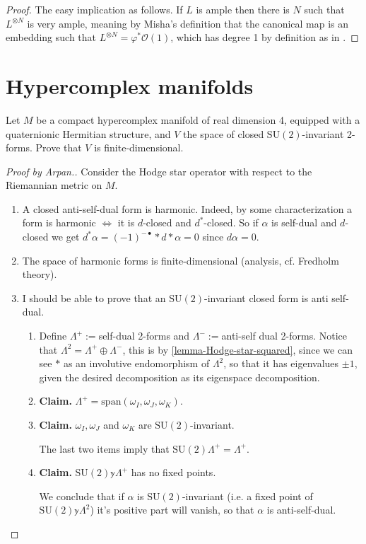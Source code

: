 \begin{proof}
The easy implication as follows. If $L$ is ample then there is $N$ such that
$L^{\otimes N}$ is very ample, meaning by Misha's definition that the canonical
map is an embedding such that $L^{\otimes N}=\varphi^*\mathcal{O}(1)$, which has
degree 1 by definition as in \cite[15.4.14]{sea}.
\end{proof}

\section{Hypercomplex manifolds}
\label{section-hypercomplex-manifolds}

\begin{exercise}
\label{exercise-SU2-invariant-forms}
Let $M$ be a compact hypercomplex manifold of real dimension 4, equipped with a
quaternionic Hermitian structure, and $V$ the space of closed
$\text{SU}(2)$-invariant 2-forms. Prove that $V$ is finite-dimensional.
\end{exercise}

\begin{proof}[Proof by Arpan.]
Consider the Hodge star operator with respect to the Riemannian metric on $M$.
\begin{enumerate}
\item A closed anti-self-dual form is harmonic. Indeed, by some 
characterization a
form is harmonic $\iff$ it is $d$-closed and $d^*$-closed. So if $\alpha$ is
self-dual and $d$-closed we get $d^*\alpha=(-1)^{-\bullet}*d*\alpha=0$ since
$d\alpha=0$.
\item The space of harmonic forms is finite-dimensional (analysis, cf. Fredholm
theory).
\item I should be able to prove that an $\text{SU}(2)$-invariant closed form is
anti self-dual.
\begin{enumerate}
\item Define $\Lambda^+:=$self-dual 2-forms and $\Lambda^-:=$anti-self dual
2-forms. Notice that $\Lambda^2=\Lambda^+ \oplus \Lambda^-$,
this is by \ref{lemma-Hodge-star-squared}, since we can
see $*$ as an involutive endomorphism of $\Lambda^2$,
so that it has eigenvalues $\pm 1$, given the
desired decomposition as its eigenspace decomposition.

\item {\bf Claim.} $\Lambda^+=\text{span}(\omega_I,\omega_J,\omega_K)$.
\item {\bf Claim.} $\omega_I,\omega_J$ and $\omega_K$ are
$\text{SU}(2)$-invariant.

The last two items imply that $\text{SU}(2)\Lambda^+=\Lambda^+$.
\item {\bf Claim.} $\text{SU}(2)\mathbb{y}\Lambda^+$ has no fixed points.

We conclude that if $\alpha$ is $\text{SU}(2)$-invariant (i.e. a fixed point of
$\text{SU}(2)\mathbb{y}\Lambda^2$) it's positive part will vanish, so that
$\alpha$ is anti-self-dual.
\end{enumerate}
\end{enumerate}
\end{proof}

